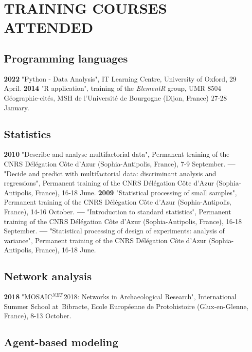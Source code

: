 \documentclass{article}
\begin{document}
\section*{TRAINING COURSES ATTENDED}

\subsection*{Programming languages}

\textbf{2022 }"\textsf{Python} - Data Analysis", IT Learning Centre, University of Oxford, 29 April.
\smallbreak
\textbf{2014 }"\textsf{R} application", training of the \textit{ElementR} group, UMR 8504 G\'{e}ographie-cit\'{e}s, MSH de l'Universit\'{e} de Bourgogne (Dijon, France) 27-28 January.
\smallbreak

\subsection*{Statistics }

\textbf{2010 }"Describe and analyse multifactorial data", Permanent training of the CNRS D\'{e}l\'{e}gation C\^{o}te d'Azur (Sophia-Antipolis, France), 7-9 September.
\smallbreak
\textbf{--- }"Decide and predict with multifactorial data: discriminant analysis and regressions", Permanent training of the CNRS D\'{e}l\'{e}gation C\^{o}te d'Azur (Sophia-Antipolis, France), 16-18 June.
\smallbreak
\textbf{2009 }"Statistical processing of small samples", Permanent training of the CNRS D\'{e}l\'{e}gation C\^{o}te d'Azur (Sophia-Antipolis, France), 14-16 October.
\smallbreak
\textbf{--- }"Introduction to standard statistics", Permanent training of the CNRS D\'{e}l\'{e}gation C\^{o}te d'Azur (Sophia-Antipolis, France), 16-18 September.
\smallbreak
\textbf{--- }"Statistical processing of design of experiments: analysis of variance", Permanent training of the CNRS D\'{e}l\'{e}gation C\^{o}te d'Azur (Sophia-Antipolis, France), 16-18 June.
\smallbreak

\subsection*{Network analysis}

\textbf{2018 }"MOSAIC${}^{NET\ }$2018: Networks in Archaeological Research", International Summer School at~Bibracte, Ecole Europ\'{e}enne de Protohistoire (Glux-en-Glenne, France), 8-13 October.

\subsection*{Agent-based modeling}
\end{document}
